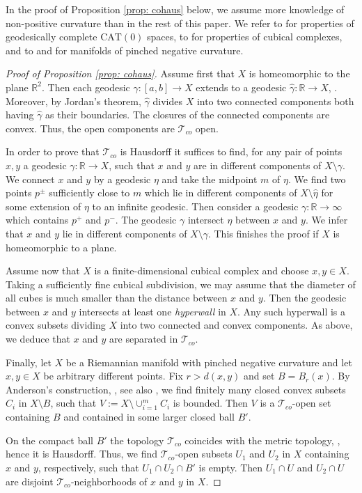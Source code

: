 \documentclass[12pt,leqno]{amsart}
\numberwithin{equation}{section}
\theoremstyle{remark}
\newcommand{\CAT}{\mathrm{CAT}}
\newcommand{\R}{\mathbb{R}}
\begin{document}
In the proof of Proposition \ref{prop: cohaus} below, we assume more knowledge of non-positive curvature than in the rest of this paper.
We refer 
to \cite{LN1} for properties of geodesically complete $\CAT(0)$ spaces,
to \cite{Schwer} for properties of cubical complexes,
and to \cite{Anderson} and \cite{Borbely} for manifolds of pinched negative curvature.

\begin{proof}[Proof of Proposition \ref{prop: cohaus}]
Assume first that $X$ is homeomorphic to the plane $\R^2$.
Then each geodesic $\gamma \colon[a,b]\to X$ extends to a geodesic $\hat \gamma \colon\R \to X$, \cite{BH}.
Moreover, by Jordan's theorem, $\hat \gamma$ divides $X$ into two connected components both having $\hat \gamma$ as their boundaries. The closures of the connected components are convex.
Thus, the open components are $\mathcal T_{co}$ open.
	
In order to prove that $\mathcal T_{co}$ is Hausdorff it suffices to find, for any pair of points $x,y$ a geodesic $\gamma \colon\R \to X$, such that $x$ and $y$ are in different components of $X\setminus \gamma$.
We connect $x$ and $y$ by a geodesic $\eta$ and take the midpoint $m$ of $\eta$.
We find two points $p^{\pm}$ sufficiently close to $m$ which lie in different components of $X\setminus \hat \eta$ for some extension of $\eta$ to an infinite geodesic.
Then consider a geodesic $\gamma\colon\R \to \infty$ which contains $p^+$ and $p^-$.
The geodesic $\gamma$ intersect $\eta$ between $x$ and $y$.
We infer that $x$ and $y$ lie in different components of $X\setminus \gamma$.
This finishes the proof if $X$ is homeomorphic to a plane.
	
	 
	 
	
	Assume now that $X$ is a finite-dimensional cubical complex and choose $x,y\in X$. Taking a sufficiently fine cubical subdivision, we may assume that the diameter of all cubes is much smaller than the distance between $x$ and $y$. Then the geodesic between $x$ and $y$ intersects at least one \emph{hyperwall} in $X$. Any such hyperwall is a convex subsets dividing $X$ into two connected and convex components. As above, we deduce that $x$ and $y$ are separated in $\mathcal T_{co}$. 
	
	
	
	
	Finally, let $X$ be a Riemannian manifold with pinched negative curvature and let $x,y\in X$
	be arbitrary different points. Fix $r>d(x,y)$ and set $B=B_r (x)$. By Anderson's construction, \cite{Anderson}, see also \cite[Theorem 2.1]{Borbely}, we find finitely many closed convex subsets $C_i$ in $X\setminus B$, such that $V\mathrel{:=}X\setminus \cup _{i=1}^m C_i$
	is bounded. Then $V$ is a $\mathcal T_{co}$-open set containing $B$ and contained in some larger closed ball $B'$. 
	
	On the compact ball $B'$ the topology $\mathcal T_{co}$ coincides with the metric topology, \cite[Lemma 17]{Monod}, hence it is Hausdorff. Thus, we find $\mathcal T_{co}$-open subsets 
	$U_1$ and $U_2$ in $X$ containing $x$ and $y$, respectively, such that $U_1\cap U_2\cap B'$ is empty. Then $U_1\cap U$ and $U_2\cap U$ are disjoint $\mathcal T_{co}$-neighborhoods of $x$ and $y$ in $X$.
\end{proof}
\end{document}
